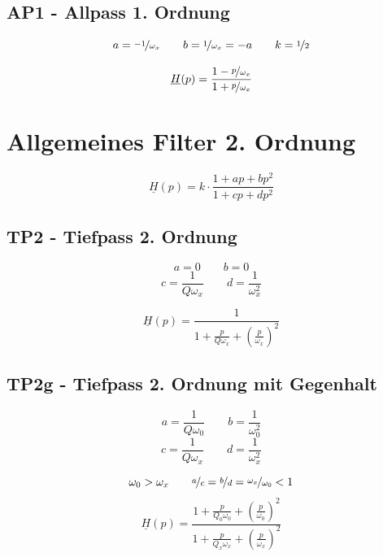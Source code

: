 \documentclass[a4paper, 12pt]{report}
\begin{document}
	\subsection*{AP1 - Allpass 1. Ordnung}
		\begin{minipage}[t]{0.5\textwidth}
			\vspace{-0.3cm}
			\[ a = \nicefrac{-1}{\omega_x} \qquad b = \nicefrac{1}{\omega_x} = -a \qquad k = \nicefrac{1}{2} \]
		\end{minipage}
		\begin{minipage}[t]{0.5\textwidth}
			\[ \underline{H}(p) = \frac{1 - \nicefrac{p}{\omega_x}}{1 + \nicefrac{p}{\omega_x}} \]
		\end{minipage}
		
\clearpage

\section*{Allgemeines Filter 2. Ordnung}

	\vspace{0.5cm}

	\begin{large}
		\[ \underline{H}(p) = k \cdot \frac{1 + ap + bp^2}{1 + cp + dp^2} \]
	\end{large}
	
	\vspace{-0.5cm}
	
	\subsection*{TP2 - Tiefpass 2. Ordnung}
		\begin{minipage}[t]{0.5\textwidth}
			\[ a = 0 \qquad b = 0 \]
			\[ c = \frac{1}{Q\omega_x} \qquad d = \frac{1}{\omega^2_x} \]
		\end{minipage}
		\begin{minipage}[t]{0.5\textwidth}
			\vspace{0.4cm}
			\[ \underline{H}(p) = \frac{1}{1 + \frac{p}{Q\omega_x} + \left(\frac{p}{\omega_x}\right)^2} \]
		\end{minipage}
	
	\subsection*{TP2g - Tiefpass 2. Ordnung mit Gegenhalt}
		\begin{minipage}[t]{0.5\textwidth}
			\[ a = \frac{1}{Q\omega_0} \qquad b = \frac{1}{\omega^2_0} \]
			\[ c = \frac{1}{Q\omega_x} \qquad d = \frac{1}{\omega^2_x} \]
		\end{minipage}
		\begin{minipage}[t]{0.5\textwidth}
			\[ \omega_0 > \omega_x \qquad \nicefrac{a}{c} = \nicefrac{b}{d} = \nicefrac{\omega_x}{\omega_0} < 1 \]
			\vspace{-0.2cm}
			\[ \underline{H}(p) = \frac{1 + \frac{p}{Q_0\omega_0} + \left(\frac{p}{\omega_0}\right)^2}{1 + \frac{p}{Q_x\omega_x} + \left(\frac{p}{\omega_x}\right)^2} \]
		\end{minipage}
	
\end{document}
